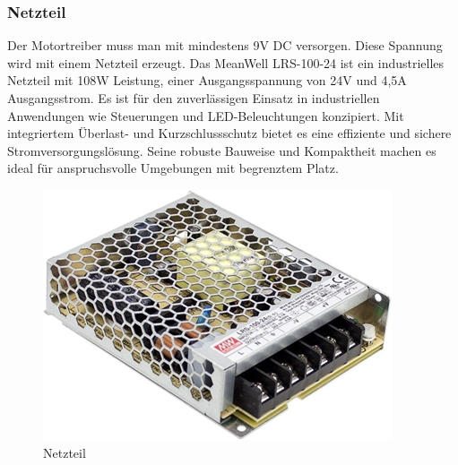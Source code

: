\subsubsection{Netzteil}
Der Motortreiber muss man mit mindestens 9V DC versorgen. Diese Spannung wird mit einem Netzteil erzeugt. Das MeanWell\autocite{MeanWell} LRS-100-24 ist ein industrielles Netzteil mit 108W Leistung, einer Ausgangsspannung von 24V und 4,5A Ausgangsstrom. Es ist für den zuverlässigen Einsatz in industriellen Anwendungen wie Steuerungen und LED-Beleuchtungen konzipiert. Mit integriertem Überlast- und Kurzschlussschutz bietet es eine effiziente und sichere Stromversorgungslösung. Seine robuste Bauweise und Kompaktheit machen es ideal für anspruchsvolle Umgebungen mit begrenztem Platz.
\vspace{5mm}
\begin{figure}[H]
    \centering
    \includegraphics{image/Netzteil.png}
    \caption{Netzteil}
    \label{fig:enter-label}
\end{figure}
